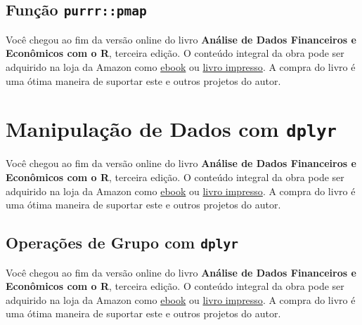 \documentclass[
  11pt,
]{book}
\newenvironment{pleasebuyit}
{\begin{noteblock}
		
	} {\end{noteblock}}
\begin{document}
\hypertarget{funuxe7uxe3o-purrrpmap}{%
\subsection{\texorpdfstring{Função \texttt{purrr::pmap}}{Função purrr::pmap}}\label{funuxe7uxe3o-purrrpmap}}

\begin{pleasebuyit}
Você chegou ao fim da versão online do livro \textbf{Análise de Dados
Financeiros e Econômicos com o R}, terceira edição. O conteúdo integral
da obra pode ser adquirido na loja da Amazon como
\href{https://www.amazon.com.br/dp/B08WNC27ZY}{ebook} ou
\href{https://www.amazon.com/dp/B08WP8CCDB}{livro impresso}. A compra do
livro é uma ótima maneira de suportar este e outros projetos do autor.
\end{pleasebuyit}

\hypertarget{manipulauxe7uxe3o-de-dados-com-dplyr}{%
\section{\texorpdfstring{Manipulação de Dados com \texttt{dplyr}}{Manipulação de Dados com dplyr}}\label{manipulauxe7uxe3o-de-dados-com-dplyr}}

\begin{pleasebuyit}
Você chegou ao fim da versão online do livro \textbf{Análise de Dados
Financeiros e Econômicos com o R}, terceira edição. O conteúdo integral
da obra pode ser adquirido na loja da Amazon como
\href{https://www.amazon.com.br/dp/B08WNC27ZY}{ebook} ou
\href{https://www.amazon.com/dp/B08WP8CCDB}{livro impresso}. A compra do
livro é uma ótima maneira de suportar este e outros projetos do autor.
\end{pleasebuyit}

\hypertarget{operauxe7uxf5es-de-grupo-com-dplyr}{%
\subsection{\texorpdfstring{Operações de Grupo com \texttt{dplyr}}{Operações de Grupo com dplyr}}\label{operauxe7uxf5es-de-grupo-com-dplyr}}

\begin{pleasebuyit}
Você chegou ao fim da versão online do livro \textbf{Análise de Dados
Financeiros e Econômicos com o R}, terceira edição. O conteúdo integral
da obra pode ser adquirido na loja da Amazon como
\href{https://www.amazon.com.br/dp/B08WNC27ZY}{ebook} ou
\href{https://www.amazon.com/dp/B08WP8CCDB}{livro impresso}. A compra do
livro é uma ótima maneira de suportar este e outros projetos do autor.
\end{pleasebuyit}
\end{document}
